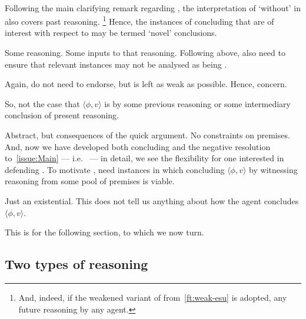 \paragraph*{\EAS{}}

\begin{note}
  Following the main clarifying remark regarding \ESU{}, the interpretation of `without' in \EAS{} also covers past reasoning.%
  \footnote{
    And, indeed, if the weakened variant of \ESU{} from~\autoref{ft:weak-esu} is adopted, any future reasoning by any agent.
  }
  Hence, the instances of concluding that are of interest with respect to \EAS{} may be termed `novel' conclusions.
\end{note}

\begin{note}
  Some reasoning.
  Some inputs to that reasoning.
  Following above, also need to ensure that relevant instances may not be analysed as being \indicateVed{}.

  Again, do not need to endorse, but \ESU{} is left as weak as possible.
  Hence, concern.

  So, not the case that \(\langle \phi,v \rangle\) is \indicateVed{} by some previous reasoning or some intermediary conclusion of present reasoning.

  Abstract, but consequences of the quick argument.
  No constraints on premises.
  And, now we have developed both concluding and the negative resolution to~\autoref{issue:Main} --- i.e.~\ESU{} --- in detail, we see the flexibility for one interested in defending \ESU{}.
  To motivate \EAS{}, need instances in which concluding \(\langle \phi,v \rangle\) by witnessing reasoning from some pool of premises is viable.
\end{note}

\begin{note}[Uninformative]
  Just an existential.
  This does not tell us anything about how the agent concludes \(\langle \phi,v \rangle\).

  This is for the following section, to which we now turn.
\end{note}

\subsection{Two types of reasoning}
\label{sec:overview:two-types-reasoning}

